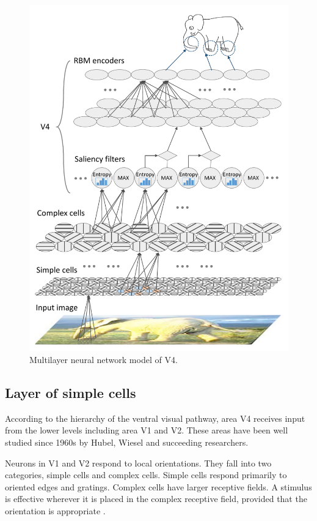 \documentclass[5p]{elsarticle}
\begin{document}
\begin{figure}
\centerline{\includegraphics[width=\linewidth]{images/fig-3.pdf}} 
\caption{Multilayer neural network model of V4.}
\label{fig:3}
\end{figure}

\subsection{Layer of simple cells}

According to the hierarchy of the ventral visual pathway,
area V4 receives input from the lower levels including area V1 and V2.
These areas have been well studied since 1960s 
by Hubel, Wiesel \cite{hubel1962,hubel1965} and succeeding researchers.

Neurons in V1 and V2 respond to local orientations.
They fall into two categories, simple cells and complex cells.
Simple cells respond primarily to oriented edges and gratings.
Complex cells have larger receptive fields.
A stimulus is effective wherever it is placed in the complex receptive field, 
provided that the orientation is appropriate \cite{hubel1962}.
\end{document}
